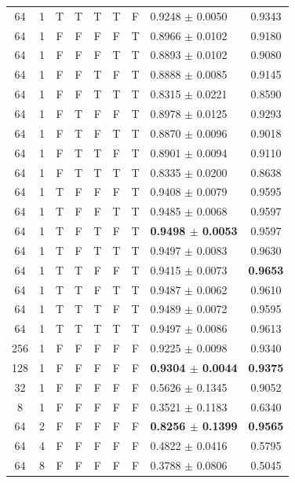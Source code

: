 \begin{table}
\begin{tabular}{c c c c c c c l c}
64 & 1 & T & T & T & T & F & 0.9248 $\pm$ 0.0050 & 0.9343 \\
64 & 1 & F & F & F & F & T & 0.8966 $\pm$ 0.0102 & 0.9180 \\
64 & 1 & F & F & F & T & T & 0.8893 $\pm$ 0.0102 & 0.9080 \\
64 & 1 & F & F & T & F & T & 0.8888 $\pm$ 0.0085 & 0.9145 \\
64 & 1 & F & F & T & T & T & 0.8315 $\pm$ 0.0221 & 0.8590 \\
64 & 1 & F & T & F & F & T & 0.8978 $\pm$ 0.0125 & 0.9293 \\
64 & 1 & F & T & F & T & T & 0.8870 $\pm$ 0.0096 & 0.9018 \\
64 & 1 & F & T & T & F & T & 0.8901 $\pm$ 0.0094 & 0.9110 \\
64 & 1 & F & T & T & T & T & 0.8335 $\pm$ 0.0200 & 0.8638 \\
64 & 1 & T & F & F & F & T & 0.9408 $\pm$ 0.0079 & 0.9595 \\
64 & 1 & T & F & F & T & T & 0.9485 $\pm$ 0.0068 & 0.9597 \\
64 & 1 & T & F & T & F & T & \textbf{0.9498 $\pm$ 0.0053} & 0.9597 \\
64 & 1 & T & F & T & T & T & 0.9497 $\pm$ 0.0083 & 0.9630 \\
64 & 1 & T & T & F & F & T & 0.9415 $\pm$ 0.0073 & \textbf{0.9653} \\
64 & 1 & T & T & F & T & T & 0.9487 $\pm$ 0.0062 & 0.9610 \\
64 & 1 & T & T & T & F & T & 0.9489 $\pm$ 0.0072 & 0.9595 \\
64 & 1 & T & T & T & T & T & 0.9497 $\pm$ 0.0086 & 0.9613 \\
\midrule
256 & 1 & F & F & F & F & F & 0.9225 $\pm$ 0.0098 & 0.9340 \\
128 & 1 & F & F & F & F & F & \textbf{0.9304 $\pm$ 0.0044} & \textbf{0.9375} \\
32 & 1 & F & F & F & F & F & 0.5626 $\pm$ 0.1345 & 0.9052 \\
8 & 1 & F & F & F & F & F & 0.3521 $\pm$ 0.1183 & 0.6340 \\
\midrule
64 & 2 & F & F & F & F & F & \textbf{0.8256 $\pm$ 0.1399} & \textbf{0.9565} \\
64 & 4 & F & F & F & F & F & 0.4822 $\pm$ 0.0416 & 0.5795 \\
64 & 8 & F & F & F & F & F & 0.3788 $\pm$ 0.0806 & 0.5045 \\
\bottomrule
\end{tabular}
\end{table}

